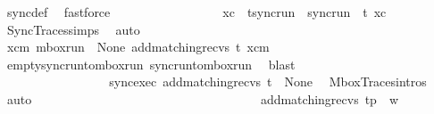\begin{isabellebody}
\ sync{\isacharunderscore}{\kern0pt}def\ \isamarkupfalse%
\ fastforce\isanewline
\ \ \ \ \ \ \ \ \ \ \ \ \ \ \isamarkupfalse%
\ \isamarkupfalse%
\ xc\ \ t{\isacharunderscore}{\kern0pt}sync{\isacharunderscore}{\kern0pt}run\ {\isacharcolon}{\kern0pt}\ {\isachardoublequoteopen}sync{\isacharunderscore}{\kern0pt}run\ {\isasymC}\isactrlsub {\isasymI}\isactrlsub {\isasymzero}\ t\ xc{\isachardoublequoteclose}\ \isamarkupfalse%
\ SyncTraces{\isachardot}{\kern0pt}simps\ \isamarkupfalse%
\ auto\isanewline
\ \ \ \ \ \ \ \ \ \ \ \ \ \ \ \ \ \ \isanewline
\ \ \ \ \ \ \ \ \ \ \ \ \ \ \isamarkupfalse%
\ \isamarkupfalse%
\ {\isachardoublequoteopen}{\isasymexists}xcm{\isachardot}{\kern0pt}\ mbox{\isacharunderscore}{\kern0pt}run\ {\isasymC}\isactrlsub {\isasymI}\isactrlsub {\isasymmm}\ None\ {\isacharparenleft}{\kern0pt}add{\isacharunderscore}{\kern0pt}matching{\isacharunderscore}{\kern0pt}recvs\ t{\isacharparenright}{\kern0pt}\ xcm{\isachardoublequoteclose}\ \isamarkupfalse%
\ empty{\isacharunderscore}{\kern0pt}sync{\isacharunderscore}{\kern0pt}run{\isacharunderscore}{\kern0pt}to{\isacharunderscore}{\kern0pt}mbox{\isacharunderscore}{\kern0pt}run\ sync{\isacharunderscore}{\kern0pt}run{\isacharunderscore}{\kern0pt}to{\isacharunderscore}{\kern0pt}mbox{\isacharunderscore}{\kern0pt}run\ \isamarkupfalse%
\ blast\isanewline
\ \ \ \ \ \ \ \ \ \ \ \ \ \ \ \ \ \ \isanewline
\ \ \ \ \ \ \ \ \ \ \ \ \ \ \isamarkupfalse%
\ \isamarkupfalse%
\ sync{\isacharunderscore}{\kern0pt}exec{\isacharcolon}{\kern0pt}\ {\isachardoublequoteopen}{\isacharparenleft}{\kern0pt}add{\isacharunderscore}{\kern0pt}matching{\isacharunderscore}{\kern0pt}recvs\ t{\isacharparenright}{\kern0pt}\ {\isasymin}\ {\isasymT}\isactrlbsub None\isactrlesub {\isachardoublequoteclose}\ \isamarkupfalse%
\ MboxTraces{\isachardot}{\kern0pt}intros\ \isamarkupfalse%
\ auto\isanewline
\ \ \ \ \ \ \ \ \ \ \ \ \ \ \ \ \ \ \isanewline
\ \ \ \ \ \ \ \ \ \ \ \ \ \ \isamarkupfalse%
\ \isamarkupfalse%
\ {\isachardoublequoteopen}{\isacharparenleft}{\kern0pt}add{\isacharunderscore}{\kern0pt}matching{\isacharunderscore}{\kern0pt}recvs\ t{\isacharparenright}{\kern0pt}{\isasymdown}\isactrlsub p\ {\isacharequal}{\kern0pt}\ {\isacharquery}{\kern0pt}w{\isacharprime}{\kern0pt}{\isachardoublequoteclose}\ \isamarkupfalse%

\end{isabellebody}
